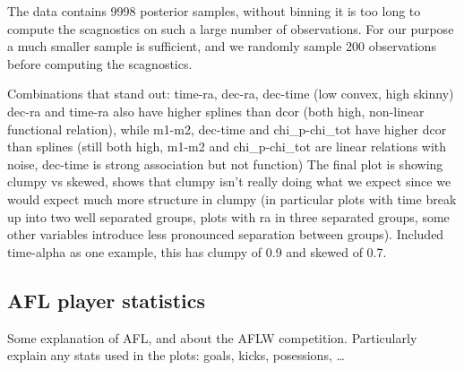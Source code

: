 The data contains 9998 posterior samples, without binning it is too long
to compute the scagnostics on such a large number of observations. For
our purpose a much smaller sample is sufficient, and we randomly sample
200 observations before computing the scagnostics.

Combinations that stand out: time-ra, dec-ra, dec-time (low convex, high
skinny) dec-ra and time-ra also have higher splines than dcor (both
high, non-linear functional relation), while m1-m2, dec-time and
chi\_p-chi\_tot have higher dcor than splines (still both high, m1-m2
and chi\_p-chi\_tot are linear relations with noise, dec-time is strong
association but not function) The final plot is showing clumpy vs
skewed, shows that clumpy isn't really doing what we expect since we
would expect much more structure in clumpy (in particular plots with
time break up into two well separated groups, plots with ra in three
separated groups, some other variables introduce less pronounced
separation between groups). Included time-alpha as one example, this has
clumpy of 0.9 and skewed of 0.7.

\hypertarget{afl-player-statistics}{%
\subsection{AFL player statistics}\label{afl-player-statistics}}

Some explanation of AFL, and about the AFLW competition. Particularly
explain any stats used in the plots: goals, kicks, posessions, \ldots{}

